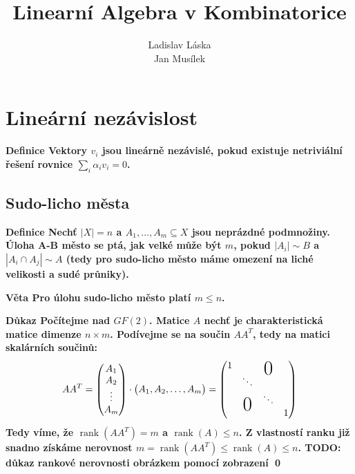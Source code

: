 \documentclass[a4paper,12pt,titlepage]{article}
\title{Linearní Algebra v Kombinatorice}
\author{Ladislav Láska\\ Jan Musílek}
\newcommand{\dk}{\smallskip\noindent\bf Důkaz\rm{} }
\newcommand{\df}{\smallskip\noindent\bf Definice\rm{} }
\newcommand{\vt}{\smallskip\noindent\bf Věta\rm{} }
\newcommand{\todo}[1]{\bf TODO: \rm#1}
\DeclareMathOperator{\rank}{rank}
\newcommand\bigzero{\makebox(0,0){\text{\huge0}}}
\begin{document}
\maketitle
\newpage
\tableofcontents
\newpage


\section{Lineární nezávislost}
\df Vektory $v_i$ jsou lineárně nezávislé, pokud existuje netriviální řešení 
rovnice $\sum_i \alpha_iv_i=0$.
\subsection{Sudo-licho města}
\df Nechť $|X|=n$ a $A_1, \dots, A_m \subseteq X$ jsou neprázdné podmnožiny.  
Úloha A-B město se ptá, jak velké může být $m$, pokud $|A_i| \sim B$ a $|A_i\cap 
A_j|\sim A$ (tedy pro sudo-licho město máme omezení na liché velikosti a sudé 
průniky).

\vt Pro úlohu sudo-licho město platí $m \leq n$.

\dk Počítejme nad $GF(2)$. Matice $A$ nechť je charakteristická matice dimenze 
$n \times m$. Podívejme se na součin $AA^T$, tedy na matici skalárních součinů:
\begin{align}
	AA^T = \left(\begin{matrix}A_1\\ A_2 \\ \vdots \\ A_m \end{matrix}\right) 
	\cdot \left(\begin{matrix}A_1, A_2, \dots, A_m\end{matrix}\right) =
	\left(\begin{matrix}
	1 & &\bigzero & \\
	& \ddots && \\
	&\bigzero& \ddots & \\
	&&  &1
	\end{matrix}\right)
\end{align}
Tedy víme, že $\rank(AA^T) = m$ a $\rank(A) \leq n$. Z vlastností ranku již 
snadno získáme nerovnost $m=\rank(AA^T) \leq \rank(A) \leq n$. \todo{důkaz 
rankové nerovnosti obrázkem pomocí zobrazení} \qed
\end{document}
